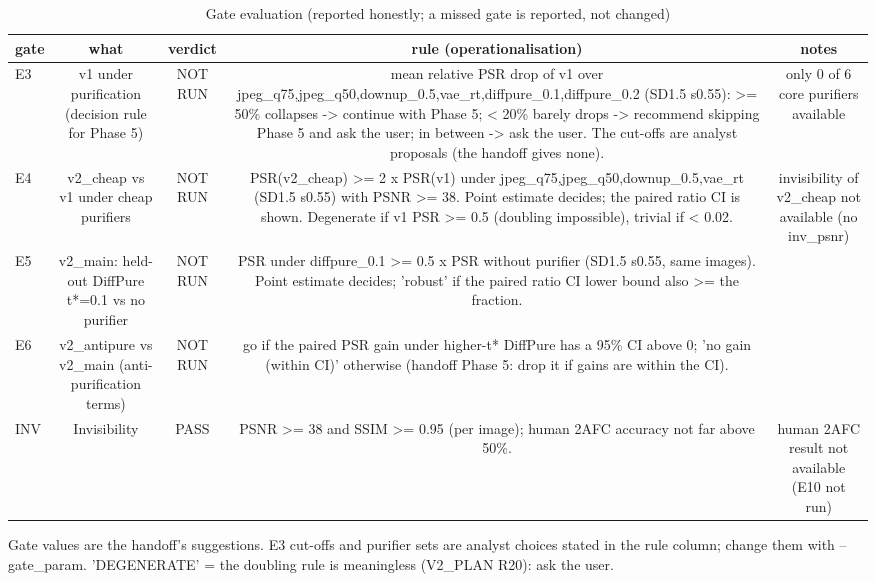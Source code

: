 \begin{table}[t]
\centering
\small
\begin{tabular}{lcccc}
\toprule
gate & what & verdict & rule (operationalisation) & notes \\
\midrule
E3 & v1 under purification (decision rule for Phase 5) & NOT RUN & mean relative PSR drop of v1 over jpeg\_q75,jpeg\_q50,downup\_0.5,vae\_rt,diffpure\_0.1,diffpure\_0.2 (SD1.5 s0.55): >= 50\% collapses -> continue with Phase 5; < 20\% barely drops -> recommend skipping Phase 5 and ask the user; in between -> ask the user. The cut-offs are analyst proposals (the handoff gives none). & only 0 of 6 core purifiers available \\
E4 & v2\_cheap vs v1 under cheap purifiers & NOT RUN & PSR(v2\_cheap) >= 2 x PSR(v1) under jpeg\_q75,jpeg\_q50,downup\_0.5,vae\_rt (SD1.5 s0.55) with PSNR >= 38. Point estimate decides; the paired ratio CI is shown. Degenerate if v1 PSR >= 0.5 (doubling impossible), trivial if < 0.02. & invisibility of v2\_cheap not available (no inv\_psnr) \\
E5 & v2\_main: held-out DiffPure t*=0.1 vs no purifier & NOT RUN & PSR under diffpure\_0.1 >= 0.5 x PSR without purifier (SD1.5 s0.55, same images). Point estimate decides; 'robust' if the paired ratio CI lower bound also >= the fraction. &  \\
E6 & v2\_antipure vs v2\_main (anti-purification terms) & NOT RUN & go if the paired PSR gain under higher-t* DiffPure has a 95\% CI above 0; 'no gain (within CI)' otherwise (handoff Phase 5: drop it if gains are within the CI). &  \\
INV & Invisibility & PASS & PSNR >= 38 and SSIM >= 0.95 (per image); human 2AFC accuracy not far above 50\%. & human 2AFC result not available (E10 not run) \\
\bottomrule
\end{tabular}
\caption{Gate evaluation (reported honestly; a missed gate is reported, not changed)}
\label{tab:gates}
\par\footnotesize Gate values are the handoff's suggestions. E3 cut-offs and purifier sets are analyst choices stated in the rule column; change them with --gate\_param. 'DEGENERATE' = the doubling rule is meaningless (V2\_PLAN R20): ask the user.
\end{table}
